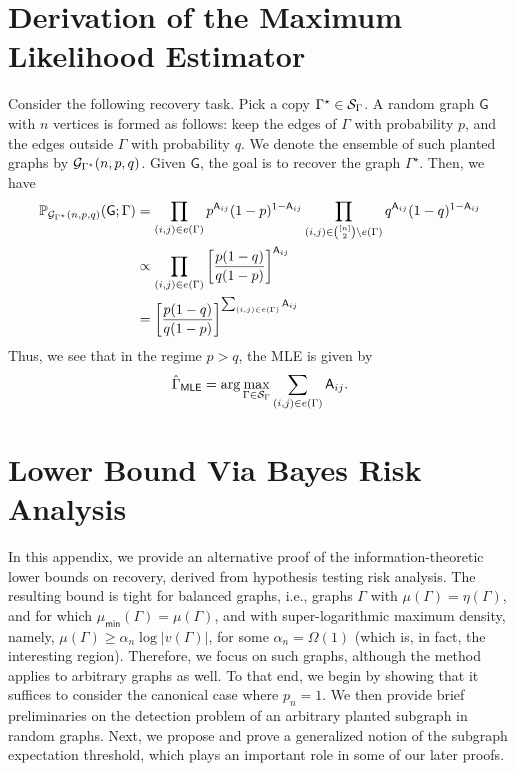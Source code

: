 \documentclass[12pt]{article}
\newcommand {\pr} {\mathbb{P}}
\newcommand{\calG}{{\cal G}}
\newcommand{\calS}{{\cal S}}
\newcommand{\pp}[1]{\left[#1\right]}
\newcommand{\s}[1]{\mathsf{#1}}
\begin{document}
\section{Derivation of the Maximum Likelihood Estimator}\label{app:0}

Consider the following recovery task. Pick a copy $\Gamma^\star\in\calS_{\Gamma}$. A random graph $\s{G}$ with $n$ vertices is formed as follows: keep the edges of $\Gamma$ with probability $p$, and the edges outside $\Gamma$ with probability $q$. We denote the ensemble of such planted graphs by $\calG_{\Gamma^\star}(n,p,q)$. Given $\s{G}$, the goal is to recover the graph $\Gamma^\star$. Then, we have
\begin{align}
    \pr_{\calG_{\Gamma^\star}(n,p,q)}(\s{G};\Gamma) &= \prod_{(i,j)\in e(\Gamma)}p^{\s{A}_{ij}}(1-p)^{1-\s{A}_{ij}}\prod_{(i,j)\in \binom{[n]}{2}\setminus e(\Gamma)}q^{\s{A}_{ij}}(1-q)^{1-\s{A}_{ij}}\\
    & \propto \prod_{(i,j)\in e(\Gamma)}\pp{\frac{p(1-q)}{q(1-p)}}^{\s{A}_{ij}}\\
    & = \pp{\frac{p(1-q)}{q(1-p)}}^{\sum_{(i,j)\in e(\Gamma)}\s{A}_{ij}}
\end{align}
Thus, we see that in the regime $p>q$, the MLE is given by
\begin{align}
\hat{\Gamma}_{\s{MLE}} = \arg\max_{\Gamma\in\calS_\Gamma}\sum_{(i,j)\in e(\Gamma)}\s{A}_{ij}.\label{eqn:combiDev}
\end{align}

\section{Lower Bound Via Bayes Risk Analysis}\label{app:secProofofITLOWEr}

In this appendix, we provide an alternative proof of the information-theoretic lower bounds on recovery, derived from hypothesis testing risk analysis. The resulting bound is tight for balanced graphs, i.e., graphs $\Gamma$ with $\mu(\Gamma) = \eta(\Gamma)$, and for which $\mu_{\s{min}}(\Gamma) = \mu(\Gamma)$, and with super-logarithmic maximum density, namely, $\mu(\Gamma)\geq\alpha_n\log|v(\Gamma)|$, for some $\alpha_n=\Omega(1)$ (which is, in fact, the interesting region).  Therefore, we focus on such graphs, although the method applies to arbitrary graphs as well. To that end, we begin by showing that it suffices to consider the canonical case where $p_n = 1$. We then provide brief preliminaries on the detection problem of an arbitrary planted subgraph in random graphs. Next, we propose and prove a generalized notion of the subgraph expectation threshold, which plays an important role in some of our later proofs.
\end{document}
